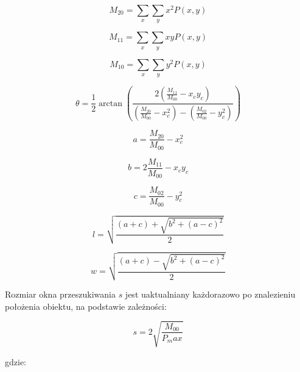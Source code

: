\begin{equation}
\label{equ:CAMSHIFT_moment_drugi_xx}
	M_{20} = \sum_x \sum_y x^2 P(x,y)
\end{equation}

\begin{equation}
\label{equ:CAMSHIFT_moment_drugi_xy}
	M_{11} = \sum_x \sum_y x y P(x,y)
\end{equation}

\begin{equation}
\label{equ:CAMSHIFT_moment_drugi_yy}
	M_{10} = \sum_x \sum_y y^2 P(x,y)
\end{equation}

\begin{equation}
\label{equ:CAMSHIFT_orientacja}
	\theta = \frac{1}{2} \arctan \left( \frac{2 \left( \frac{M_{11}}{M_{00}} - x_c y_c \right)}{\left( \frac{M_{20}}{M_{00}} - x_c^2 \right) - \left( \frac{M_{02}}{M_00} - y_c^2 \right) } \right)
\end{equation}

\begin{equation}
\label{equ:CAMSHIFT_wspolczynnik_a}
	a = \frac{M_{20}}{M_{00}} - x_c^2
\end{equation}

\begin{equation}
\label{equ:CAMSHIFT_wspolczynnik_b}
	b = 2 \frac{M_{11}}{M_{00}} - x_c y_c
\end{equation}

\begin{equation}
\label{equ:CAMSHIFT_wspolczynnik_c}
	c = \frac{M_{02}}{M_{00}} - y_c^2
\end{equation}

\begin{equation}
\label{equ:CAMSHIFT_dlugosc}
	l = \sqrt{\frac{(a + c) + \sqrt{b^2 + (a-c)^2}}{2}}
\end{equation}

\begin{equation}
\label{equ:CAMSHIFT_szerokosc}
	w = \sqrt{\frac{(a + c) - \sqrt{b^2 + (a-c)^2}}{2}}
\end{equation}

Rozmiar okna przeszukiwania $s$ jest uaktualniany każdorazowo po znalezieniu położenia obiektu, na podstawie zależności:

\begin{equation}
\label{equ:CAMSHIFT_rozmiar_okna}
	s = 2 \sqrt{\frac{M_{00}}{P_max}}
\end{equation}

\noindent
gdzie:

